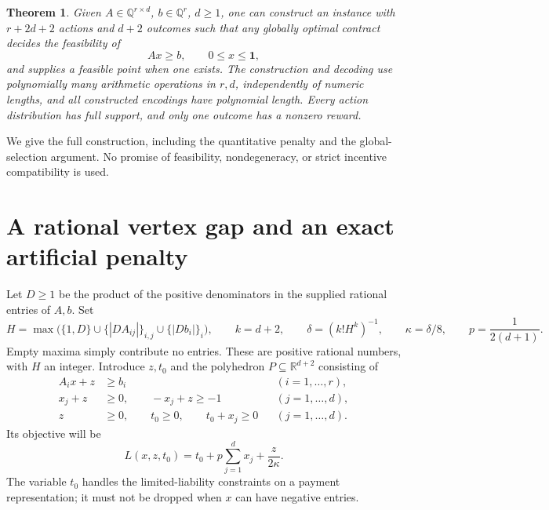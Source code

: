 \documentclass[11pt]{article}
\newtheorem{theorem}{Theorem}
\newcommand{\Q}{\mathbb Q}
\newcommand{\R}{\mathbb R}
\newcommand{\one}{\mathbf 1}
\begin{document}
\begin{theorem}\label{thm:main}
Given \(A\in\Q^{r\times d}\), \(b\in\Q^r\), \(d\geq1\), one can
construct an instance with \(r+2d+2\) actions and \(d+2\) outcomes such
that any globally optimal contract decides the feasibility of
\[
 Ax\geq b,\qquad 0\leq x\leq\one,                 \tag{1}
\]
and supplies a feasible point when one exists. The construction and decoding
use polynomially many arithmetic operations in \(r,d\), independently of
numeric lengths, and all constructed encodings have polynomial length.
Every action distribution has full support, and only one outcome has a
nonzero reward.
\end{theorem}

We give the full construction, including the quantitative penalty and the
global-selection argument. No promise of feasibility, nondegeneracy, or
strict incentive compatibility is used.

\section{A rational vertex gap and an exact artificial penalty}
Let \(D\geq1\) be the product of the positive denominators in the supplied
rational entries of \(A,b\). Set
\[
 H=\max\bigl(\{1,D\}\cup\{|DA_{ij}|\}_{i,j}
                         \cup\{|Db_i|\}_i\bigr),\qquad
 k=d+2,\qquad \delta=(k!H^k)^{-1},\qquad
 \kappa=\delta/8,\qquad p=\frac1{2(d+1)}.          \tag{2}
\]
Empty maxima simply contribute no entries. These are positive rational
numbers, with \(H\) an integer. Introduce \(z,t_0\) and the polyhedron
\(P\subseteq\R^{d+2}\) consisting of
\begin{align}
 A_i x+z&\geq b_i &&(i=1,\ldots,r),\nonumber\\
 x_j+z&\geq0,\qquad -x_j+z\geq-1 &&(j=1,\ldots,d),\nonumber\\
 z&\geq0,\qquad t_0\geq0,\qquad t_0+x_j\geq0 &&(j=1,\ldots,d).
                                                        \tag{3}
\end{align}
Its objective will be
\[
 L(x,z,t_0)=t_0+p\sum_{j=1}^d x_j+\frac{z}{2\kappa}. \tag{4}
\]
The variable \(t_0\) handles the limited-liability constraints on a payment
representation; it must not be dropped when \(x\) can have negative entries.
\end{document}
